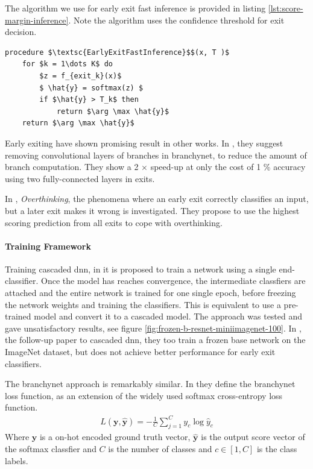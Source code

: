 The algorithm we use for early exit fast inference is provided in listing \ref{lst:score-margin-inference}. Note the algorithm uses the confidence threshold for exit decision.

\begin{minipage}{\linewidth}
	\begin{lstlisting}[language = {}, mathescape=true, caption={Early Exit using Score-margin }, label={lst:score-margin-inference}]
procedure $\textsc{EarlyExitFastInference}$$(x, T )$
	for $k = 1\dots K$ do
		$z = f_{exit_k}(x)$
		$ \hat{y} = softmax(z) $
		if $\hat{y} > T_k$ then
			return $\arg \max \hat{y}$
	return $\arg \max \hat{y}$ 
	\end{lstlisting}
\end{minipage}

Early exiting have shown promising result in other works. In \cite{berestizshevsky_sacrificing_2019}, they suggest removing convolutional layers of branches in \gls{branchynet}, to reduce the amount of branch computation. They show a 2 $ \times $ speed-up at only the cost of 1 \% accuracy using two fully-connected layers in exits.

In \cite{kaya_shallow-deep_nodate}, \emph{Overthinking}, the phenomena where an early exit correctly classifies an input, but a later exit makes it wrong is investigated. They propose to use the highest scoring prediction from all exits to cope with overthinking. 

\paragraph{Training Framework} 
Training cascaded \gls{dnn}, in \cite{leroux_resource-constrained_2015} it is proposed to train a network using a single end-classifier. Once the model has reaches convergence, the intermediate classfiers are attached and the entire network is trained for one single epoch, before freezing the network weights and training the classifiers. This is equivalent to use a pre-trained model and convert it to a cascaded model. The approach was tested and gave unsatisfactory results, see figure \ref{fig:frozen-b-resnet-miniimagenet-100}. In \cite{leroux_cascading_2017}, the follow-up paper to cascaded \gls{dnn}, they too train a frozen base network on the ImageNet dataset, but does not achieve better performance for early exit classifiers.  

The \gls{branchynet} approach is remarkably similar. In \cite{teerapittayanon_branchynet:_2016} they define the \gls{branchynet} loss function, as an extension of the widely used softmax cross-entropy loss function.
\begin{align}
L\left(\mathbf{y},\hat{\mathbf{y}}\right) = - \frac{1}{C} \sum_{j =1}^{C} y_c \log \hat{y}_c
\end{align}
Where $ \bm{y} $ is a on-hot encoded ground truth vector, $ \bm{\hat{y}} $ is the output score vector of the softmax classfier and $ C $ is the number of classes and $ c \in \left[1, C\right] $ is the class labels.
	

